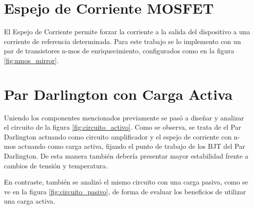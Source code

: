 \section{Espejo de Corriente MOSFET}

El Espejo de Corriente permite forzar la corriente a la salida del dispositivo a una corriente de referencia determinada. Para este trabajo se lo implemento con un par de transistores n-mos de enriquecimiento, configurados como en la figura \ref{fig:nmos_mirror}.

\section{Par Darlington con Carga Activa}
Uniendo los componentes mencionados previamente se pasó a diseñar y analizar el circuito de la figura \ref{fig:circuito_activo}. Como se observa, se trata de el Par Darlington actuando como circuito amplificador y el espejo de corriente con n-mos actuando como carga activa, fijando el punto de trabajo de los BJT del Par Darlington. De esta manera también debería presentar mayor estabilidad frente a cambios de tensión y temperatura.

En contraste, también se analizó el mismo circuito con una carga pasiva, como se ve en la figura \ref{fig:circuito_pasivo}, de forma de evaluar los beneficios de utilizar una carga activa.

